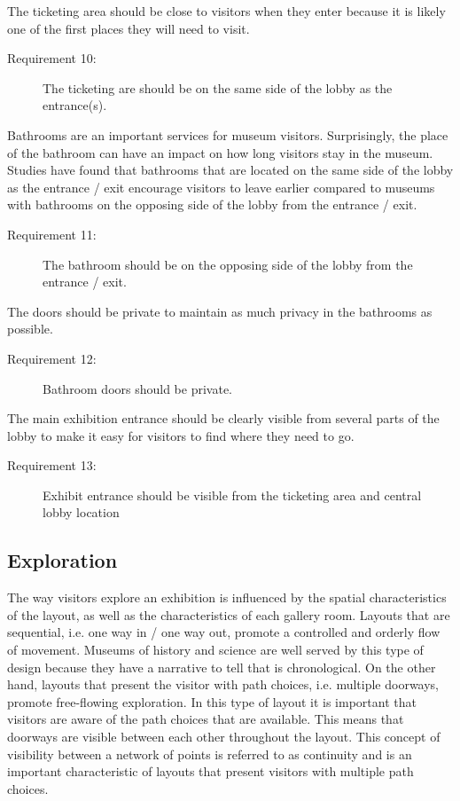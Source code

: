 \documentclass[12pt]{ucthesis}
\begin{document}
The ticketing area should be close to visitors when they enter because it is likely one of the first places they will need to visit.
\begin{description}
\item[Requirement 10:] The ticketing are should be on the same side of the lobby as the entrance(s).
\end{description}

Bathrooms are an important services for museum visitors. Surprisingly, the place of the bathroom can have an impact on how long visitors stay in the museum. Studies \cite{tbd} have found that bathrooms that are located on the same side of the lobby as the entrance / exit encourage visitors to leave earlier compared to museums with bathrooms on the opposing side of the lobby from the entrance / exit. 

\begin{description}
\item[Requirement 11:] The bathroom should be on the opposing side of the lobby from the entrance / exit.
\end{description}

The doors should be private to maintain as much privacy in the bathrooms as possible.

\begin{description}
\item[Requirement 12:] Bathroom doors should be private.  
\end{description}

The main exhibition entrance should be clearly visible from several parts of the lobby to make it easy for visitors to find where they need to go. 
\begin{description}
\item[Requirement 13:] Exhibit entrance should be visible from the ticketing area and central lobby location
\end{description}


\subsection{Exploration}
The way visitors explore an exhibition is influenced by the spatial characteristics of the layout, as well as the characteristics of each gallery room. Layouts that are sequential, i.e. one way in / one way out, promote a controlled and orderly flow of movement. Museums of history and science are well served by this type of design because they have a narrative to tell that is chronological. On the other hand, layouts that present the visitor with path choices, i.e. multiple doorways, promote free-flowing exploration. In this type of layout it is important that visitors are aware of the path choices that are available. This means that doorways are visible between each other throughout the layout. This concept of visibility between a network of points is referred to as continuity and is an important characteristic of layouts that present visitors with multiple path choices.  
\end{document}
